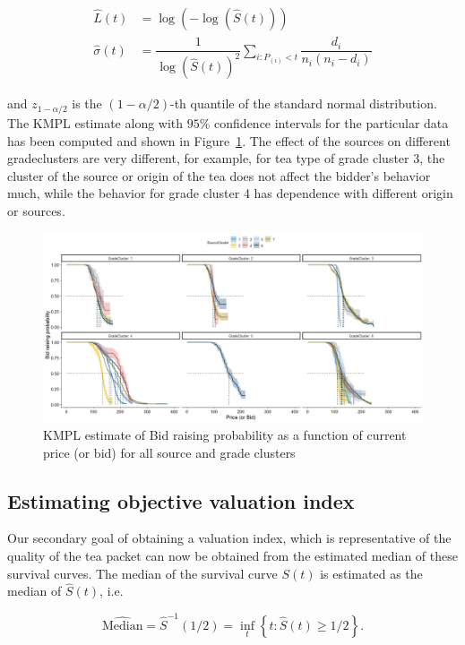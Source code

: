 \documentclass[a4paper,12pt]{article}
\begin{document}
\begin{align*}
    \widehat{L}(t) & = \log\left( -\log(\widehat{S}(t)) \right)\\
    \widehat{\sigma}(t) & = \dfrac{1}{\log(\widehat{S}(t))^2} \sum_{i : P_{(i)} < t} \dfrac{d_i}{n_i(n_i - d_i)}
\end{align*}

\noindent and $z_{1-\alpha/2}$ is the $(1 - \alpha/2)$-th quantile of the standard normal distribution. The KMPL estimate along with $95\%$ confidence intervals for the particular data has been computed and shown in Figure~\ref{fig:kmpl-est}. The effect of the sources on different gradeclusters are very different, for example, for tea type of grade cluster 3, the cluster of the source or origin of the tea does not affect the bidder's behavior much, while the behavior for grade cluster 4 has dependence with different origin or sources.

\begin{figure}[htb]
    \centering
    \includegraphics[width = \textwidth]{figures/kmpl-est.jpeg}
    \caption{KMPL estimate of Bid raising probability as a function of current price (or bid) for all source and grade clusters}
    \label{fig:kmpl-est}
\end{figure}

\subsection{Estimating objective valuation index}

Our secondary goal of obtaining a valuation index, which is representative of the quality of the tea packet can now be obtained from the estimated median of these survival curves. The median of the survival curve $S(t)$ is estimated as the median of $\widehat{S}(t)$, i.e. 

$$
\widehat{\text{Median}} = \widehat{S}^{-1}(1/2) = \inf_{t} \left\{ t: \widehat{S}(t) \geq 1/2 \right\}.
$$
\end{document}
